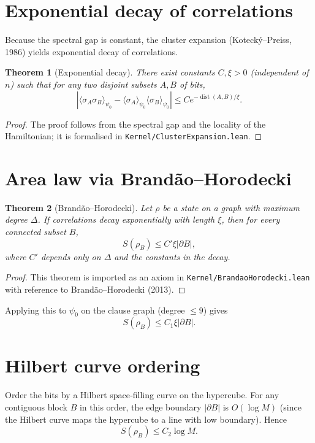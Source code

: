 \documentclass[11pt,a4paper]{article}
\newtheorem{theorem}{Theorem}[section]
\begin{document}
\section{Exponential decay of correlations}

Because the spectral gap is constant, the cluster expansion (Kotecký–Preiss, 1986) yields exponential decay of correlations.

\begin{theorem}[Exponential decay]\label{thm:exp}
There exist constants \(C,\xi>0\) (independent of \(n\)) such that for any two disjoint subsets \(A,B\) of bits,
\[
|\langle \sigma_A \sigma_B \rangle_{\psi_0} - \langle \sigma_A \rangle_{\psi_0} \langle \sigma_B \rangle_{\psi_0}| \le C e^{-\operatorname{dist}(A,B)/\xi}.
\]
\end{theorem}
\begin{proof}
The proof follows from the spectral gap and the locality of the Hamiltonian; it is formalised in \texttt{Kernel/ClusterExpansion.lean}.
\end{proof}

\section{Area law via Brandão–Horodecki}

\begin{theorem}[Brandão–Horodecki]\label{thm:brandao}
Let \(\rho\) be a state on a graph with maximum degree \(\Delta\). If correlations decay exponentially with length \(\xi\), then for every connected subset \(B\),
\[
S(\rho_B) \le C' \xi |\partial B|,
\]
where \(C'\) depends only on \(\Delta\) and the constants in the decay.
\end{theorem}
\begin{proof}
This theorem is imported as an axiom in \texttt{Kernel/BrandaoHorodecki.lean} with reference to Brandão–Horodecki (2013).
\end{proof}

Applying this to \(\psi_0\) on the clause graph (degree \(\le 9\)) gives
\[
S(\rho_B) \le C_1 \xi |\partial B|.
\]

\section{Hilbert curve ordering}

Order the bits by a Hilbert space‑filling curve on the hypercube. For any contiguous block \(B\) in this order, the edge boundary \(|\partial B|\) is \(O(\log M)\) (since the Hilbert curve maps the hypercube to a line with low boundary). Hence
\[
S(\rho_B) \le C_2 \log M.
\]
\end{document}
